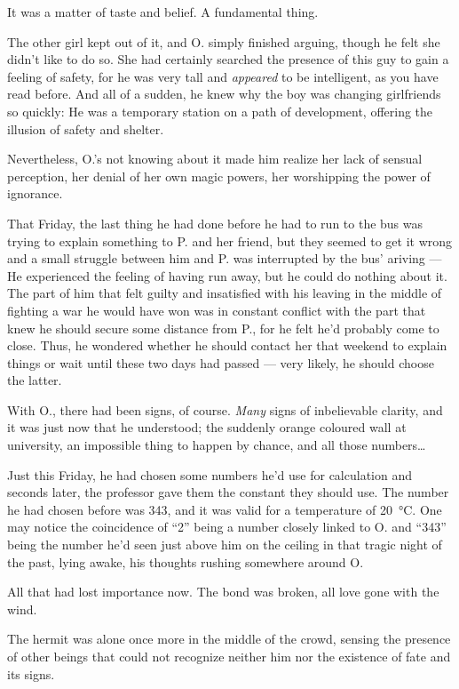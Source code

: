 It was a matter of taste and belief. 
A fundamental thing.

The other girl kept out of it, and O. simply finished arguing, though he felt she didn't like to do so. She had certainly searched the presence of this guy to gain a feeling of safety, for he was very tall and \emph{appeared} to be intelligent, as you have read before. And all of a sudden, he knew why the boy was changing girlfriends so quickly: He was a temporary station on a path of development, offering the illusion of safety and shelter.

Nevertheless, O.'s not knowing about it made him realize her lack of sensual perception, her denial of her own magic powers, her worshipping the power of ignorance.

That Friday, the last thing he had done before he had to run to the bus was trying to explain something to P. and her friend, but they seemed to get it wrong and a small struggle between him and P. was interrupted by the bus' ariving --- He experienced the feeling of having run away, but he could do nothing about it. The part of him that felt guilty and insatisfied with his leaving in the middle of fighting a war he would have won was in constant conflict with the part that knew he should secure some distance from P., for he felt he'd probably come to close. Thus, he wondered whether he should contact her that weekend to explain things or wait until these two days had passed --- very likely, he should choose the latter.

With O., there had been signs, of course. \emph{Many} signs of inbelievable clarity, and it was just now that he understood; the suddenly orange coloured wall at university, an impossible thing to happen by chance, and all those numbers\ldots

Just this Friday, he had chosen some numbers he'd use for calculation and seconds later, the professor gave them the constant they should use. The number he had chosen before was 343, and it was valid for a temperature of \SI{20}{\celsius}. One may notice the coincidence of \enquote{2} being a number closely linked to O. and \enquote{343} being the number he'd seen just above him on the ceiling in that tragic night of the past, lying awake, his thoughts rushing somewhere around O.

All that had lost importance now. The bond was broken, all love gone with the wind.

The hermit was alone once more in the middle of the crowd, sensing the presence of other beings that could not recognize neither him nor the existence of fate and its signs.

